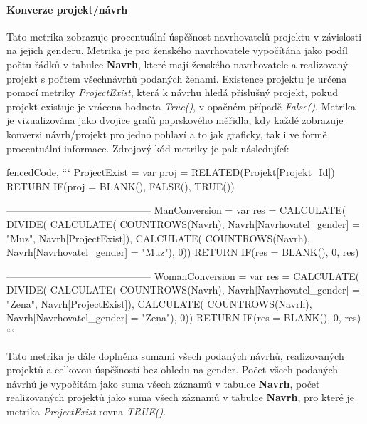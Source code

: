 \documentclass[
  digital,     %
  twoside,     %
  lof,         %
  lot,         %
]{fithesis4}
\begin{document}
\paragraph{Konverze projekt/návrh} Tato metrika zobrazuje procentuální úspěšnost navrhovatelů projektu v závislosti na jejich genderu. Metrika je pro ženského navrhovatele vypočítána jako podíl počtu řádků v tabulce \textbf{Navrh}, které mají ženského navrhovatele a realizovaný projekt s počtem všechnávrhů podaných ženami. Existence projektu je určena pomocí metriky \emph{ProjectExist}, která k návrhu hledá příslušný projekt, pokud projekt existuje je vrácena hodnota \emph{True()}, v opačném případě \emph{False()}. Metrika je vizualizována jako dvojice grafů paprskového měřidla, kdy každé zobrazuje konverzi návrh/projekt pro jedno pohlaví a to jak graficky, tak i ve formě procentuální informace.
Zdrojový kód metriky je pak následující:

\begin{tcolorbox}
\begin{markdown*}{%
  fencedCode,
}
```
ProjectExist = 
    var proj = RELATED(Projekt[Projekt_Id]) 
RETURN IF(proj = BLANK(), FALSE(), TRUE())

--------------------------------------------
ManConversion = 
    var res = CALCULATE(
        DIVIDE(
            CALCULATE(
                COUNTROWS(Navrh), 
                    Navrh[Navrhovatel_gender] = "Muz",
                    Navrh[ProjectExist]),
            CALCULATE(
                COUNTROWS(Navrh),
                    Navrh[Navrhovatel_gender] = "Muz"),
                    0))
RETURN IF(res = BLANK(), 0, res)

--------------------------------------------
WomanConversion = 
    var res = CALCULATE(
        DIVIDE(
            CALCULATE(
                COUNTROWS(Navrh), 
                Navrh[Navrhovatel_gender] = "Zena",
                Navrh[ProjectExist]),
            CALCULATE(
                COUNTROWS(Navrh),
                Navrh[Navrhovatel_gender] = "Zena"),
                0))
RETURN IF(res = BLANK(), 0, res)
```
\end{markdown*}
\end{tcolorbox}

Tato metrika je dále doplněna sumami všech podaných návrhů, realizovaných projektů a celkovou úspěšností bez ohledu na gender. Počet všech podaných návrhů je vypočítám jako suma všech záznamů v tabulce \textbf{Navrh}, počet realizovaných projektů jako suma všech záznamů v tabulce \textbf{Navrh}, pro které je metrika \emph{ProjectExist} rovna \emph{TRUE()}.
\end{document}
